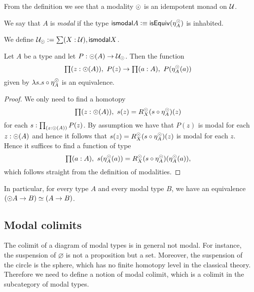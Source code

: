 From the definition we see that a modality $\odot$ is an idempotent monad on $\mathcal{U}$.

\begin{defn}
  We say that $A$ is {\em modal} if the type $\mathsf{ismodal} A\vcentcolon\equiv \mathsf{isEquiv}(\eta^{\odot}_A)$ is inhabited.
\end{defn}

\begin{defn}
  We define $\mathcal{U}_{\odot}:=\sum(X:\mathcal{U}),\mathsf{ismodal} X$. 
\end{defn}

\begin{thm}\label{prop:lv_n_deptype_sec_equiv_by_precomp}
Let $A$ be a type and let $P:\odot(A)\to\mathcal{U}_{\odot}$. Then the function
\begin{equation*}
\prd{z:\modal(A)}P(z)\to\prd{a:A}P(\mreturn^\modal_A(a))
\end{equation*}
given by $\lambda s.s\circ \eta^{\odot}_A$ is an equivalence.
\end{thm}

\begin{proof}
We only need to find a homotopy
\begin{equation*}
\prd{z:\modal(A)}s(z)= R^\modal_X(s\circ \mreturn^\modal_A)(z)
\end{equation*}
for each $s:\prd{z:\modal(A)}P(z)$. By assumption we have that $P(z)$ is
modal for each $z:\odot(A)$ and hence it follows that $s(z)= R^{\odot}_X(s\circ \eta^{\odot}_A)(z)$
is modal for each $z$. Hence it suffices to find a function of type
\begin{equation*}
\prd{a:A}s(\mreturn^\modal_A(a))= R^\modal_X(s\circ \mreturn^\modal_A)(\mreturn^\modal_A(a)),
\end{equation*}
which follows straight from the definition of modalities.
\end{proof}

In particular, for every type $A$ and every modal type $B$, we have an equivalence $(\odot A\to B)\simeq (A\to B)$.

\subsection*{Modal colimits}
The colimit of a diagram of modal types is in general not modal. For instance,
the suspension of $\varnothing$ is not a proposition but a set.
Moreover, the suspension of the circle is the sphere, which has no finite 
homotopy level in the classical theory. Therefore we need to define a notion of 
modal colimit, which is a colimit in the subcategory of modal types.

